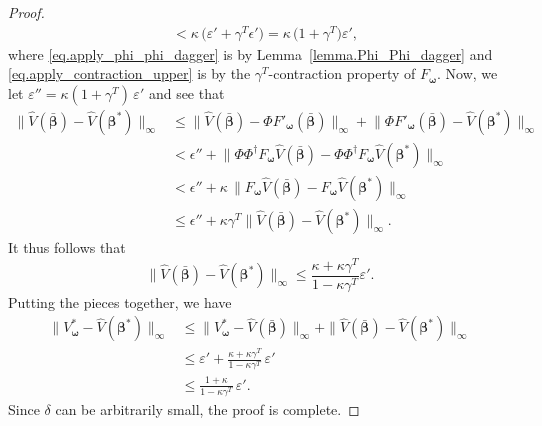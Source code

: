 \documentclass[11pt, notitlepage]{article}
\newcommand{\1}{\mathbbm{1}}
\begin{document}
\begin{proof}
\begin{align}
        &< \kappa \, \bigl( \varepsilon' +  \gamma^T \epsilon' \bigr) = \kappa \, \bigl(1 + \gamma^T\bigr) \varepsilon',\label{eq.apply_contraction_upper}
    \end{align}
    where \eqref{eq.apply_phi_phi_dagger} is by Lemma~\ref{lemma.Phi_Phi_dagger} and \eqref{eq.apply_contraction_upper} is by the $\gamma^T$-contraction property of $F_{\boldsymbol{\omega}}$.
    Now, we let $\varepsilon'' = \kappa (1+\gamma^T) \, \varepsilon'$ and see that
    \begin{align*}
        \bigl \|\hat{V}(\bar{\boldsymbol{\beta}}) - \hat{V}(\boldsymbol{\beta}^*) \bigr\|_\infty
        &\leq \bigl\|\hat{V}(\bar{\boldsymbol{\beta}}) - \Phi F'_{\boldsymbol{\omega}} (\bar{\boldsymbol{\beta}}) \bigr\|_\infty + \bigl \|\Phi F'_{\boldsymbol{\omega}} (\bar{\boldsymbol{\beta}}) - \hat{V}(\boldsymbol{\beta}^*) \bigr\|_\infty\\
        &< \epsilon'' + \bigl \|\Phi \Phi^{\dagger} F_{\boldsymbol{\omega}} \hat{V}(\bar{\boldsymbol{\beta}}) - \Phi \Phi^{\dagger} F_{\boldsymbol{\omega}} \hat{V}(\boldsymbol{\beta}^*)\bigr\|_\infty\\
        &< \epsilon'' + \kappa \, \bigl \|F_{\boldsymbol{\omega}} \hat{V}(\bar{\boldsymbol{\beta}}) - F_{\boldsymbol{\omega}} \hat{V}(\boldsymbol{\beta}^*) \bigr\|_\infty\\
        &\leq \epsilon'' + \kappa\gamma^T \bigl\|\hat{V}(\bar{\boldsymbol{\beta}}) - \hat{V}(\boldsymbol{\beta}^*) \bigr\|_\infty.
    \end{align*}
    It thus follows that 
    \begin{equation*}
        \bigl \|\hat{V}(\bar{\boldsymbol{\beta}}) - \hat{V}(\boldsymbol{\beta}^*) \bigr\|_\infty
        \leq \frac{\kappa + \kappa \gamma^T}{1- \kappa \gamma^T} \varepsilon'. 
    \end{equation*}
    Putting the pieces together, we have
    \begin{align*}
        \bigl\|V^*_{\boldsymbol{\omega}} - \hat{V}(\boldsymbol{\beta}^*)\bigr\|_\infty
        &\leq \bigl\|V^*_{\boldsymbol{\omega}} - \hat{V}(\bar{\boldsymbol{\beta}}) \bigr\|_\infty + \|\hat{V}(\bar{\boldsymbol{\beta}}) - \hat{V}(\boldsymbol{\beta}^*)\bigr\|_\infty\\
        &\leq \varepsilon' + \frac{\kappa + \kappa \gamma^T}{1- \kappa \gamma^T} \, \varepsilon' \\
        &\leq  \frac{1 + \kappa}{1- \kappa \gamma^T}\,\varepsilon'.
    \end{align*}
    Since $\delta$ can be arbitrarily small, the proof is complete.
\end{proof}
\end{document}
